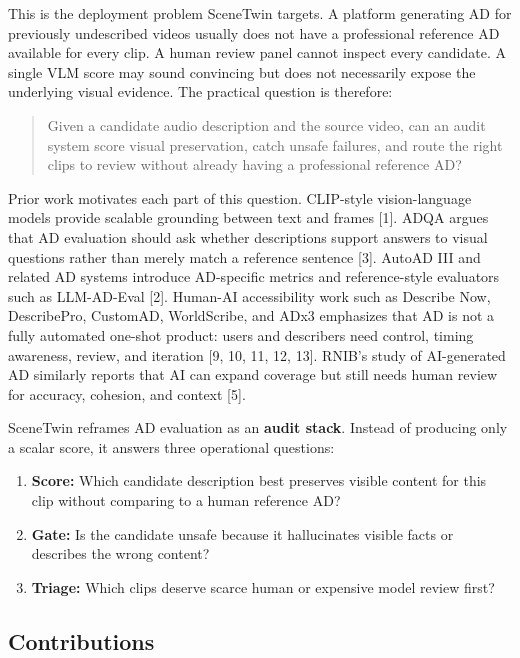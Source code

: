 \documentclass[10pt,twocolumn]{article}
\begin{document}
This is the deployment problem SceneTwin targets. A platform generating AD for previously undescribed videos usually does not have a professional reference AD available for every clip. A human review panel cannot inspect every candidate. A single VLM score may sound convincing but does not necessarily expose the underlying visual evidence. The practical question is therefore:


\begin{quote}Given a candidate audio description and the source video, can an audit system score visual preservation, catch unsafe failures, and route the right clips to review without already having a professional reference AD?\end{quote}

Prior work motivates each part of this question. CLIP-style vision-language models provide scalable grounding between text and frames [1]. ADQA argues that AD evaluation should ask whether descriptions support answers to visual questions rather than merely match a reference sentence [3]. AutoAD III and related AD systems introduce AD-specific metrics and reference-style evaluators such as LLM-AD-Eval [2]. Human-AI accessibility work such as Describe Now, DescribePro, CustomAD, WorldScribe, and ADx3 emphasizes that AD is not a fully automated one-shot product: users and describers need control, timing awareness, review, and iteration [9, 10, 11, 12, 13]. RNIB's study of AI-generated AD similarly reports that AI can expand coverage but still needs human review for accuracy, cohesion, and context [5].


SceneTwin reframes AD evaluation as an \textbf{audit stack}. Instead of producing only a scalar score, it answers three operational questions:


\begin{enumerate}[leftmargin=*]
\item \textbf{Score:} Which candidate description best preserves visible content for this clip without comparing to a human reference AD?
\item \textbf{Gate:} Is the candidate unsafe because it hallucinates visible facts or describes the wrong content?
\item \textbf{Triage:} Which clips deserve scarce human or expensive model review first?
\end{enumerate}

\subsection{Contributions}
\end{document}
